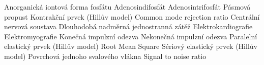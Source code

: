  {Anorganická iontová forma fosfátu}
          {Adenosindifosfát}
          {Adenosintrifosfát}
           {Pásmová propust}
           {Kontrakční prvek (Hillův model)}
         {Common mode rejection ratio}
          {Centrální nervová soustava}
         {Dlouhodobá nadměrná jednostranná zátěž}
          {Elektrokardiografie}
          {Elektromyografie}
          {Konečná impulzní odezva}
          {Nekonečná impulzní odezva}
          {Paralelní elastický prvek (Hillův model)}
          {Root Mean Square}
          {Sériový elastický prvek (Hillův model)}
         {Povrchová }
        { jednoho svalového vlákna}
          {Signal to noise ratio}
